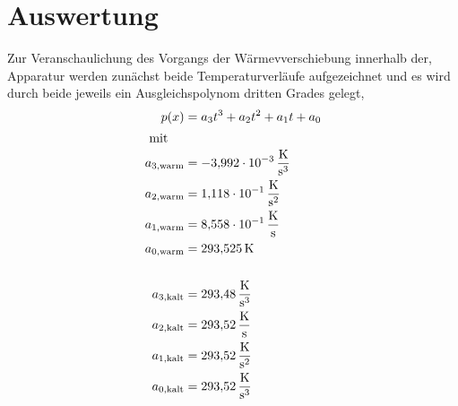 


\section{Auswertung}
\label{sec:Auswertung}


Zur Veranschaulichung des Vorgangs der Wärmevverschiebung innerhalb der,
Apparatur werden zunächst beide Temperaturverläufe aufgezeichnet und es wird durch beide jeweils ein Ausgleichspolynom dritten Grades gelegt,
\begin{align*}
  p(x) &= a_3t^3 + a_2t^2 + a_1t+a_0\\
  \intertext{ mit }
  a_{3,\text{warm}}&= \SI{-3,992e-3}{\kelvin\per\second\cubed}\\
  a_{2,\text{warm}}&= \SI{1,118e-1}{\kelvin\per\second\squared}\\
  a_{1,\text{warm}}&= \SI{8,558e-1}{\kelvin\per\second}\\
  a_{0,\text{warm}}&= \SI{293,525}{\kelvin}\\
  \\
  a_{3,\text{kalt}}&= \SI{293,48}{\kelvin\per\second\cubed}\\
  a_{2,\text{kalt}}&= \SI{293,52}{\kelvin\per\second}\\ 
  a_{1,\text{kalt}}&= \SI{293,52}{\kelvin\per\second\squared}\\
  a_{0,\text{kalt}}&= \SI{293,52}{\kelvin\per\second\cubed}\\
\end{align*}

